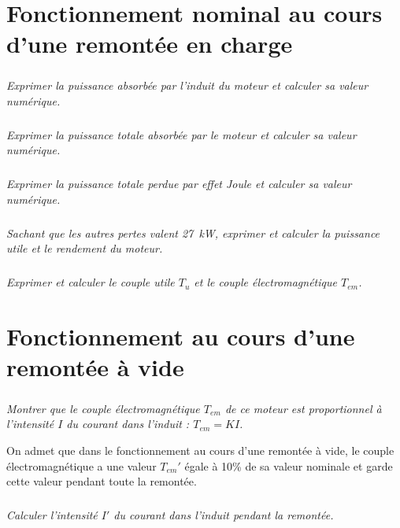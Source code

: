 \documentclass[10pt,fleqn]{article} %
\begin{document}
\begin{multicols}{2}
\begin{multicols}{2}
\section*{ Fonctionnement nominal au cours d'une remontée en charge}

\subparagraph{}\textit{Exprimer la puissance absorbée par l'induit du moteur et calculer sa valeur numérique.}
\ifprof
\begin{corrige}
\end{corrige}
\else
\fi

\subparagraph{}\textit{Exprimer la puissance totale absorbée par le moteur et calculer sa valeur numérique. }
\ifprof
\begin{corrige}
\end{corrige}
\else
\fi

\subparagraph{}\textit{Exprimer la puissance totale perdue par effet Joule et calculer sa valeur numérique. }
\ifprof
\begin{corrige}
\end{corrige}
\else
\fi

\subparagraph{}\textit{Sachant que les autres pertes valent \SI{27}{kW}, exprimer et calculer la puissance utile et le
rendement du moteur.}
\ifprof
\begin{corrige}
\end{corrige}
\else
\fi

\subparagraph{}\textit{Exprimer et calculer le couple utile $T_u$ et le couple
électromagnétique $T_{em}$.}
\ifprof
\begin{corrige}
\end{corrige}
\else
\fi



\section*{ Fonctionnement au cours d'une remontée à vide}


\subparagraph{}\textit{ Montrer que le couple électromagnétique $T_{em}$ de ce moteur est proportionnel
à l'intensité $I$ du courant dans l'induit : $T_{em} = KI$. }
\ifprof
\begin{corrige}
\end{corrige}
\else
\fi


On admet que dans le fonctionnement au cours d'une remontée à vide, le couple
électromagnétique a une valeur $T_{em}'$ égale à 10\% de sa valeur nominale et garde cette valeur
pendant toute la remontée. 

\subparagraph{}\textit{Calculer l'intensité $I'$ du courant dans l'induit pendant la remontée. }
\ifprof
\begin{corrige}
\end{corrige}
\else
\fi



\end{multicols}
\end{multicols}
\end{document}
